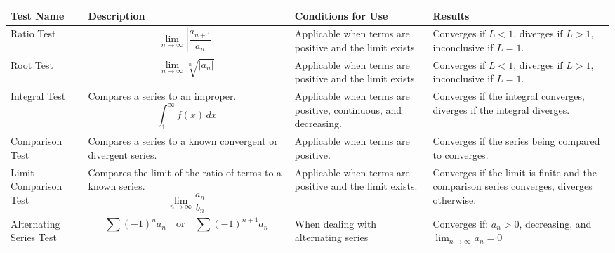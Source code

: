 \begin{table}[htbp]
    \centering
    \begin{tabular}{| m{2cm} | m{5cm} | m{3cm} | m{3cm} |}
        \hline
        \textbf{Test Name}         & \textbf{Description}                                                                                  & \textbf{Conditions for Use}                                               & \textbf{Results}                                                                          \\
        \hline
        Ratio Test                 & \[ \lim_{n \to \infty} \left| \frac{a_{n+1}}{a_n} \right| \]                                          & Applicable when terms are positive and the limit exists.                  & Converges if \( L < 1 \), diverges if \( L > 1 \), inconclusive if \( L = 1 \).           \\
        \hline
        Root Test                  & \[ \lim_{n \to \infty} \sqrt[n]{|a_n|} \]                                                             & Applicable when terms are positive and the limit exists.                  & Converges if \( L < 1 \), diverges if \( L > 1 \), inconclusive if \( L = 1 \).           \\
        \hline
        Integral Test              & Compares a series to an improper. \[ \int_{1}^{\infty} f(x) \, dx \]                                  & Applicable when terms are positive, continuous, and decreasing.           & Converges if the integral converges, diverges if the integral diverges.                   \\
        \hline
        Comparison Test            & Compares a series to a known convergent or divergent series.                                          & Applicable when terms are positive.                                       & Converges if the series being compared to converges.                                      \\
        \hline
        Limit Comparison Test      & Compares the limit of the ratio of terms to a known series. \[ \lim_{n \to \infty} \frac{a_n}{b_n} \] & Applicable when terms are positive and the limit exists.                  & Converges if the limit is finite and the comparison series converges, diverges otherwise. \\
        \hline
        Alternating Series Test    & \[ \sum (-1)^n a_n \quad \text{or}\quad \sum (-1)^{n+1} a_n \]
                                   & When dealing with alternating series                                                                  & Converges if: $a_n > 0$, decreasing, and $\lim_{n\to \infty}a_n = 0     $                                                                                             \\

\end{tabular}
\end{table}
